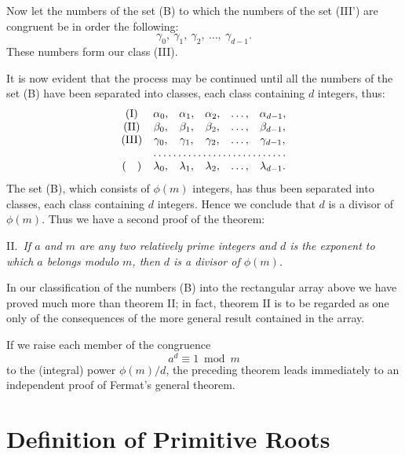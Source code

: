 \documentclass[oneside]{book}
\begin{document}
Now let the numbers of the set (B) to which the numbers of the set
(III') are congruent be in order the following:
\begin{equation}
\gamma_0,\ \gamma_1,\ \gamma_2,\ \ldots,\ \gamma_{d-1}. \tag{III}
\end{equation}
These numbers form our class (III).

It is now evident that the process may be continued until all the
numbers of the set (B) have been separated into classes, each class
containing $d$ integers, thus:
\begin{equation*}
\begin{matrix}
(\text{I})   & \alpha_0, & \alpha_1, & \alpha_2,
                                         & \ldots, & \alpha_{d-1}, \\
(\text{II})  & \beta_0,  & \beta_1,  & \beta_2,
                                         & \ldots, & \beta_{d-1},  \\
(\text{III}) & \gamma_0, & \gamma_1, & \gamma_2,
                                         & \ldots, & \gamma_{d-1}, \\
&\hdotsfor{5} \\
(\quad  )  & \lambda_0, & \lambda_1, & \lambda_2,
                                           & \ldots, & \lambda_{d-1}.
\end{matrix}
\end{equation*}
The set (B), which consists of $\phi(m)$ integers, has thus been
separated into classes, each class containing $d$ integers. Hence we
conclude that $d$ is a divisor of $\phi(m)$. Thus we have a second
proof of the theorem:

\smallskip II.~\emph{If $a$ and $m$ are any two relatively prime
integers and $d$ is the exponent to which $a$ belongs modulo $m$,
then $d$ is a divisor of $\phi(m)$.}

In our classification of the numbers (B) into the rectangular array
above we have proved much more than theorem II; in fact, theorem II
is to be regarded as one only of the consequences of the more
general result contained in the array.

If we raise each member of the congruence
\begin{equation*}
a^d \equiv 1 \bmod m
\end{equation*}
to the (integral) power $\phi(m)/d$, the preceding theorem leads
immediately to an independent proof of Fermat's general theorem.

\section{Definition of Primitive Roots}\label{s34}
\end{document}
